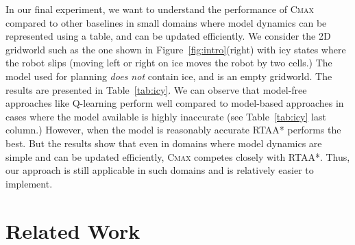 In our final experiment, we want to understand the performance of \textsc{Cmax}
compared to other baselines in small domains where model dynamics
can be represented using a table, and can be updated efficiently.
We consider the 2D gridworld such
as the one shown in Figure~\ref{fig:intro}(right) with icy
states where the robot slips (moving left or right on ice moves the
robot by two cells.) The model used for planning
\textit{does not} contain ice, and is an
empty gridworld.
The results are
presented in Table~\ref{tab:icy}. We can observe that model-free approaches like
Q-learning perform well compared to model-based approaches in cases where the model available is
highly inaccurate (see Table~\ref{tab:icy} last column.) However, when
the model is reasonably accurate
RTAA* performs the best. But the
results show that even in domains where model 
dynamics are simple and can be updated efficiently, \textsc{Cmax} competes closely
with RTAA*. Thus, our approach is still applicable in such
domains and is relatively easier to implement.

\section{Related Work}
\label{sec:related-work}

